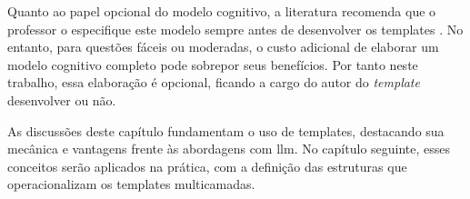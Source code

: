 Quanto ao papel opcional do modelo cognitivo, a literatura recomenda que o professor o especifique este modelo sempre antes de desenvolver os templates \parencite{gierl2021}. No entanto, para questões fáceis ou moderadas, o custo adicional de elaborar um modelo cognitivo completo pode sobrepor seus benefícios. Por tanto neste trabalho, essa elaboração é opcional, ficando a cargo do autor do \textit{template} desenvolver ou não.

As discussões deste capítulo fundamentam o uso de templates, destacando sua mecânica e vantagens frente às abordagens com \gls{llm}. No capítulo seguinte, esses conceitos serão aplicados na prática, com a definição das estruturas que operacionalizam os templates multicamadas.



